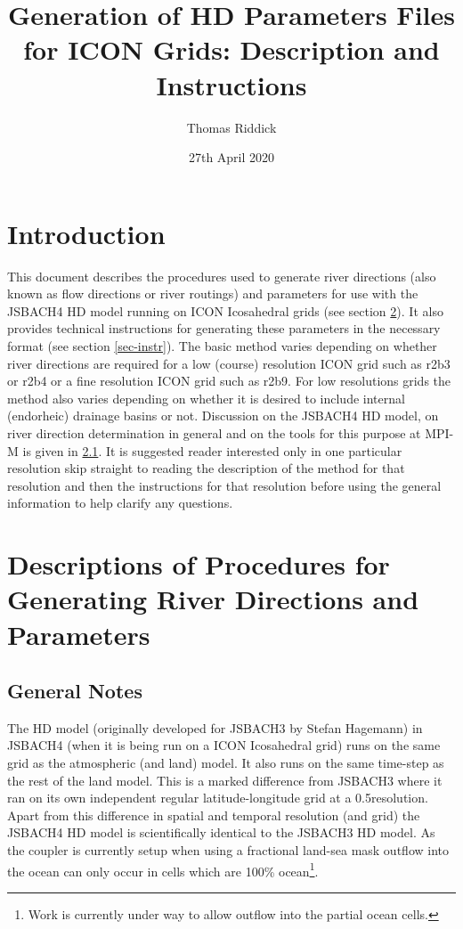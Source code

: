 \documentclass{article}
\title{Generation of HD Parameters Files for ICON Grids: Description and Instructions}
\author{Thomas Riddick}
\date{27th April 2020}
\begin{document}
\maketitle
\tableofcontents
\newpage
\lstset{language=bash}
\section{Introduction}
This document describes the procedures used to generate river directions (also known as flow directions or river routings) and parameters for use with the JSBACH4 HD model running on ICON Icosahedral grids (see section \ref{sec-desc}). It also provides technical instructions for generating these parameters in the necessary format (see section \ref{sec-instr}). The basic method varies depending on whether river directions are required for a low (course) resolution ICON grid such as r2b3 or r2b4 or a fine resolution ICON grid such as r2b9. For low resolutions grids the method also varies depending on whether it is desired to include internal (endorheic) drainage basins or not. Discussion on the JSBACH4 HD model, on river direction determination in general and on the tools for this purpose at MPI-M is given in \ref{sub-sec-desc-gen-notes}. It is suggested reader interested only in one particular resolution skip straight to reading the description of the method for that resolution and then the instructions for that resolution before using the general information to help clarify any questions.
\section{Descriptions of Procedures for Generating River Directions and Parameters} \label{sec-desc}
\subsection{General Notes} \label{sub-sec-desc-gen-notes}
The HD model (originally developed for JSBACH3 by Stefan Hagemann\cite{Hagemann:1998aa,Hagemann:1998ab,JGRD:JGRD8049}) in JSBACH4 (when it is being run on a ICON Icosahedral grid) runs on the same grid as the atmospheric (and land) model. It also runs on the same time-step as the rest of the land model. This is a marked difference from JSBACH3 where it ran on its own independent regular latitude-longitude grid at a 0.5\degree resolution. Apart from this difference in spatial and temporal resolution (and grid) the JSBACH4 HD model is scientifically identical to the JSBACH3 HD model. As the coupler is currently setup when using a fractional land-sea mask outflow into the ocean can only occur in cells which are 100\% ocean\footnote{Work is currently under way to allow outflow into the partial ocean cells.}. 
\end{document}
